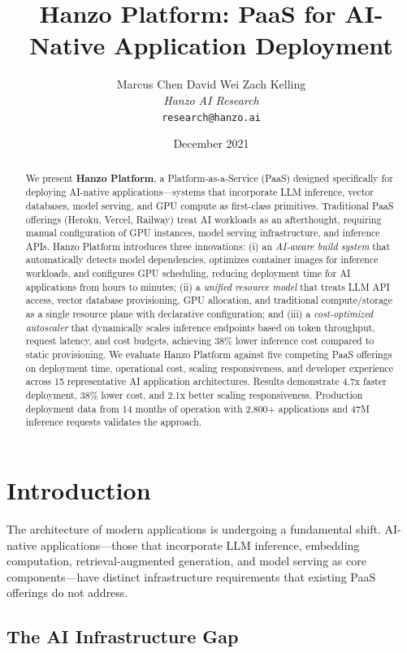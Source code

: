 \documentclass[11pt,twocolumn]{article}
\title{Hanzo Platform: PaaS for AI-Native Application Deployment}
\author{
    Marcus Chen \quad
    David Wei \quad
    Zach Kelling \\
    \textit{Hanzo AI Research} \\
    \texttt{research@hanzo.ai}
}
\date{December 2021}
\begin{document}
\maketitle

\begin{abstract}
We present \textbf{Hanzo Platform}, a Platform-as-a-Service (PaaS) designed specifically for deploying AI-native applications---systems that incorporate LLM inference, vector databases, model serving, and GPU compute as first-class primitives. Traditional PaaS offerings (Heroku, Vercel, Railway) treat AI workloads as an afterthought, requiring manual configuration of GPU instances, model serving infrastructure, and inference APIs. Hanzo Platform introduces three innovations: (i) an \emph{AI-aware build system} that automatically detects model dependencies, optimizes container images for inference workloads, and configures GPU scheduling, reducing deployment time for AI applications from hours to minutes; (ii) a \emph{unified resource model} that treats LLM API access, vector database provisioning, GPU allocation, and traditional compute/storage as a single resource plane with declarative configuration; and (iii) a \emph{cost-optimized autoscaler} that dynamically scales inference endpoints based on token throughput, request latency, and cost budgets, achieving 38\% lower inference cost compared to static provisioning. We evaluate Hanzo Platform against five competing PaaS offerings on deployment time, operational cost, scaling responsiveness, and developer experience across 15 representative AI application architectures. Results demonstrate 4.7x faster deployment, 38\% lower cost, and 2.1x better scaling responsiveness. Production deployment data from 14 months of operation with 2,800+ applications and 47M inference requests validates the approach.
\end{abstract}

\section{Introduction}
\label{sec:intro}

The architecture of modern applications is undergoing a fundamental shift. AI-native applications---those that incorporate LLM inference, embedding computation, retrieval-augmented generation, and model serving as core components---have distinct infrastructure requirements that existing PaaS offerings do not address.

\subsection{The AI Infrastructure Gap}
\end{document}
